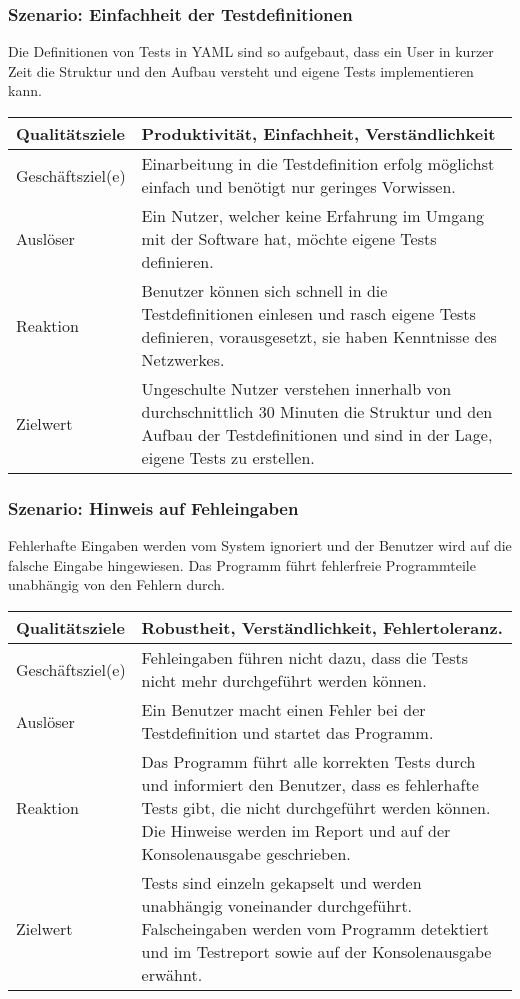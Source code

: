 \documentclass[
	ngerman,
	toc=listof, %
	toc=bibliography, %
	footnotes=multiple, %
	parskip=half, %
	numbers=noendperiod %
]{scrartcl}
\begin{document}
		\subsubsection{Szenario: Einfachheit der Testdefinitionen}
			Die Definitionen von Tests in YAML sind so aufgebaut, dass ein User in kurzer Zeit die Struktur und den Aufbau versteht und eigene Tests implementieren kann.
			
			\begin{tabularx}{\textwidth}{lX}
				\toprule
				Qualitätsziele & Produktivität, Einfachheit, Verständlichkeit \\
				\midrule
				Geschäftsziel(e) & Einarbeitung in die Testdefinition erfolg möglichst einfach und benötigt nur geringes Vorwissen.  \\
				\midrule
				Auslöser & Ein Nutzer, welcher keine Erfahrung im Umgang mit der Software hat, möchte eigene Tests definieren.  \\
				\midrule
				Reaktion & Benutzer können sich schnell in die Testdefinitionen einlesen und rasch eigene Tests definieren, vorausgesetzt, sie haben Kenntnisse des Netzwerkes.  \\
				\midrule
				Zielwert & Ungeschulte Nutzer verstehen innerhalb von durchschnittlich 30 Minuten die Struktur und den Aufbau der Testdefinitionen und sind in der Lage, eigene Tests zu erstellen.  \\
				\bottomrule
			\end{tabularx}
			
		\subsubsection{Szenario: Hinweis auf Fehleingaben}
		Fehlerhafte Eingaben werden vom System ignoriert und der Benutzer wird auf die falsche Eingabe hingewiesen. Das Programm führt fehlerfreie Programmteile unabhängig von den Fehlern durch.
			
		\begin{tabularx}{\textwidth}{lX}
			\toprule
			Qualitätsziele & Robustheit, Verständlichkeit, Fehlertoleranz.  \\
			\midrule
			Geschäftsziel(e) & Fehleingaben führen nicht dazu, dass die Tests nicht mehr durchgeführt werden können.  \\
			\midrule
			Auslöser & Ein Benutzer macht einen Fehler bei der Testdefinition und startet das Programm.  \\
			\midrule
			Reaktion & Das Programm führt alle korrekten Tests durch und informiert den Benutzer, dass es fehlerhafte Tests gibt, die nicht durchgeführt werden können. Die Hinweise werden im Report und auf der Konsolenausgabe geschrieben.   \\
			\midrule
			Zielwert & Tests sind einzeln gekapselt und werden unabhängig voneinander durchgeführt. Falscheingaben werden vom Programm detektiert und im Testreport sowie auf der Konsolenausgabe erwähnt.  \\
			\bottomrule
		\end{tabularx}
		
\end{document}
